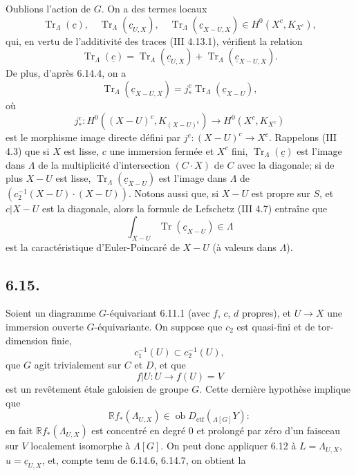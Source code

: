 \documentclass[11pt]{article}
\newcommand{\R}{\mathbb{R}}\newcommand{\RHomCore}{\mathbb{R}\mathrm{Hom}}
\providecommand{\Tr}{\operatorname{Tr}}
\providecommand{\Tr}{\operatorname{Tr}}
\providecommand{\Ob}{\operatorname{ob}}
\providecommand{\Tr}{\operatorname{Tr}}
\providecommand{\Ob}{\operatorname{ob}}
\providecommand{\R}{\mathrm R}
\providecommand{\Tr}{\operatorname{Tr}}
\providecommand{\Ob}{\operatorname{Ob}}
\providecommand{\Tr}{\operatorname{Tr}}
\providecommand{\Ob}{\operatorname{ob}}
\providecommand{\Ob}{\operatorname{Ob}}
\begin{document}
Oublions l'action de $G$. On a des termes locaux
\begin{equation}
\Tr_{\Lambda}(\underline c),\quad
\Tr_{\Lambda}(\underline c_{U,X}),\quad
\Tr_{\Lambda}(\underline c_{X-U,X})
\in H^0(X^c,K_{X^c}),
\tag{6.14.5}
\end{equation}
qui, en vertu de l'additivité des traces (III 4.13.1), vérifient la relation
\begin{equation}
\Tr_{\Lambda}(\underline c)
=
\Tr_{\Lambda}(\underline c_{U,X})
+
\Tr_{\Lambda}(\underline c_{X-U,X}).
\tag{6.14.6}
\end{equation}
De plus, d'après 6.14.4, on a
\begin{equation}
\Tr_{\Lambda}(\underline c_{X-U,X})
=
j_*^c\Tr_{\Lambda}(\underline c_{X-U}),
\tag{6.14.7}
\end{equation}
où
\[
j_*^c:H^0((X-U)^c,K_{(X-U)^c})\longrightarrow H^0(X^c,K_{X^c})
\]
est le morphisme image directe défini par $j^c:(X-U)^c\to X^c$. Rappelons (III 4.3) que si $X$ est lisse, $c$ une immersion fermée et $X^c$ fini, $\Tr_{\Lambda}(\underline c)$ est l'image dans $\Lambda$ de la multiplicité d'intersection $(C\cdot X)$ de $C$ avec la diagonale; si de plus $X-U$ est lisse, $\Tr_{\Lambda}(\underline c_{X-U})$ est l'image dans $\Lambda$ de $(c_2^{-1}(X-U)\cdot(X-U))$. Notons aussi que, si $X-U$ est propre sur $S$, et $c|X-U$ est la diagonale, alors la formule de
Lefschetz 
(III 4.7) entraîne que
\[
\int_{X-U}\Tr(\underline c_{X-U})\in\Lambda
\]
est la caractéristique d'Euler-Poincaré de $X-U$ (à valeurs dans $\Lambda$).

\subsection*{6.15.}
Soient un diagramme $G$-équivariant 6.11.1 (avec $f$, $c$, $d$ propres), et $U\to X$ une immersion ouverte $G$-équivariante. On suppose que $c_2$ est quasi-fini et de tor-dimension finie,
\[
c_1^{-1}(U)\subset c_2^{-1}(U),
\]
que $G$ agit trivialement sur $C$ et $D$, et que
\[
f|U:U\longrightarrow f(U)=V
\]
est un revêtement étale galoisien de groupe $G$. Cette dernière hypothèse implique que
\[
\R f_*(\Lambda_{U,X})\in\Ob D_{\mathrm{ctf}}({}_{\Lambda[G]}Y):
\]
en fait $\R f_*(\Lambda_{U,X})$ est concentré en degré $0$ et prolongé par zéro d'un faisceau sur $V$ localement isomorphe à $\Lambda[G]$. On peut donc appliquer 6.12 à $L=\Lambda_{U,X}$, $u=\underline c_{U,X}$, et, compte tenu de 6.14.6, 6.14.7, on obtient la
\end{document}
